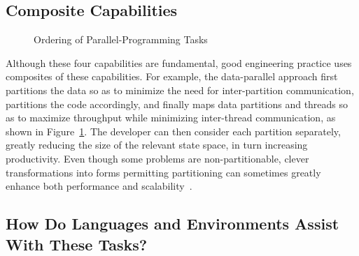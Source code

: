 \subsection{Composite Capabilities}
\label{sec:Composite Capabilities}

\begin{figure}[tb]
\begin{center}
\end{center}
\caption{Ordering of Parallel-Programming Tasks}
\label{fig:intro:Ordering of Parallel-Programming Tasks}
\end{figure}

Although these four capabilities are fundamental,
good engineering practice uses composites of
these capabilities.
For example, the data-parallel approach first
partitions the data so as to minimize the need for
inter-partition communication, partitions the code accordingly,
and finally maps data partitions and threads so as to maximize
throughput while minimizing inter-thread communication,
as shown in
Figure~\ref{fig:intro:Ordering of Parallel-Programming Tasks}.
The developer can then
consider each partition separately, greatly reducing the size
of the relevant state space, in turn increasing productivity.
Even though some problems are non-partitionable,
clever transformations into forms permitting partitioning can
sometimes greatly enhance
both performance and scalability~\cite{PanagiotisMetaxas1999PDCS}.

\subsection{How Do Languages and Environments Assist With These Tasks?}
\label{sec:intro:How Do Languages and Environments Assist With These Tasks?}

